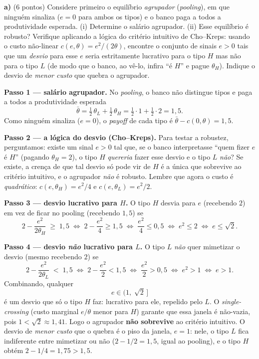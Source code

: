 \textbf{a)} (6 pontos) Considere primeiro o equil\'ibrio \emph{agrupador} (\emph{pooling}), em que ningu\'em sinaliza ($e=0$ para ambos os tipos) e o banco paga a todos a produtividade esperada. (i) Determine o sal\'ario agrupador. (ii) Esse equil\'ibrio \'e robusto? Verifique aplicando a l\'ogica do crit\'erio intuitivo de Cho--Kreps: usando o custo n\~ao-linear $c(e,\theta)=e^{2}/(2\theta)$, encontre o conjunto de sinais $e>0$ tais que um \emph{desvio} para esse $e$ seria estritamente lucrativo para o tipo $H$ mas n\~ao para o tipo $L$ (de modo que o banco, ao v\^e-lo, infira ``\'e $H$'' e pague $\theta_H$). Indique o desvio de \emph{menor custo} que quebra o agrupador.
\resolucaobox{5.5cm}
\begin{solucao}
\textbf{Passo 1 --- sal\'ario agrupador.} No \emph{pooling}, o banco n\~ao distingue tipos e paga a todos a produtividade esperada
\[
\bar\theta=\tfrac12\,\theta_L+\tfrac12\,\theta_H=\tfrac12\cdot 1+\tfrac12\cdot 2=1{,}5.
\]
Como ningu\'em sinaliza ($e=0$), o \emph{payoff} de cada tipo \'e $\bar\theta-c(0,\theta)=1{,}5$.

\textbf{Passo 2 --- a l\'ogica do desvio (Cho--Kreps).} Para testar a robustez, perguntamos: existe um sinal $e>0$ tal que, se o banco interpretasse ``quem fizer $e$ \'e $H$'' (pagando $\theta_H=2$), o tipo $H$ \emph{quereria} fazer esse desvio e o tipo $L$ \emph{n\~ao}? Se existe, a cren\c{c}a de que tal desvio s\'o pode vir de $H$ \'e a \'unica que sobrevive ao crit\'erio intuitivo, e o agrupador \emph{n\~ao} \'e robusto. Lembre que agora o custo \'e \emph{quadr\'atico}: $c(e,\theta_H)=e^{2}/4$ e $c(e,\theta_L)=e^{2}/2$.

\textbf{Passo 3 --- desvio lucrativo para $H$.} O tipo $H$ desvia para $e$ (recebendo $2$) em vez de ficar no pooling (recebendo $1{,}5$) se
\[
2-\frac{e^{2}}{2\theta_H}\;\ge\;1{,}5
\;\Longleftrightarrow\;
2-\frac{e^{2}}{4}\ge 1{,}5
\;\Longleftrightarrow\;
\frac{e^{2}}{4}\le 0{,}5
\;\Longleftrightarrow\;
e^{2}\le 2
\;\Longleftrightarrow\;
e\le \sqrt{2}.
\]

\textbf{Passo 4 --- desvio \emph{n\~ao} lucrativo para $L$.} O tipo $L$ \emph{n\~ao} quer mimetizar o desvio (mesmo recebendo $2$) se
\[
2-\frac{e^{2}}{2\theta_L}\;<\;1{,}5
\;\Longleftrightarrow\;
2-\frac{e^{2}}{2}<1{,}5
\;\Longleftrightarrow\;
\frac{e^{2}}{2}> 0{,}5
\;\Longleftrightarrow\;
e^{2}>1
\;\Longleftrightarrow\;
e>1.
\]
Combinando, qualquer
\[
e\in(1,\;\sqrt{2}\,]
\]
\'e um desvio que s\'o o tipo $H$ faz: lucrativo para ele, repelido pelo $L$. O \emph{single-crossing} (custo marginal $e/\theta$ menor para $H$) garante que essa janela \'e n\~ao-vazia, pois $1<\sqrt{2}\approx 1{,}41$. Logo o agrupador \textbf{n\~ao sobrevive} ao crit\'erio intuitivo. O desvio de \emph{menor custo} que o quebra \'e o piso da janela, $e=1$: nele, o tipo $L$ fica indiferente entre mimetizar ou n\~ao ($2-1/2=1{,}5$, igual ao pooling), e o tipo $H$ obt\'em $2-1/4=1{,}75>1{,}5$.


\end{solucao}
